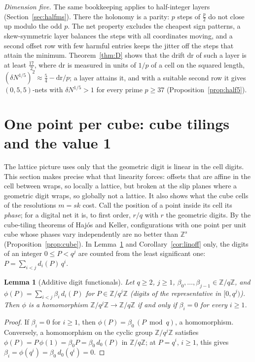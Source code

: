 \documentclass[11pt]{amsart}
\newtheorem{lemma}[theorem]{Lemma}
\theoremstyle{definition}
\theoremstyle{plain}
\newcommand{\Z}{\mathbb{Z}}
\begin{document}
\emph{Dimension five.} The same bookkeeping applies to half-integer layers (Section~\ref{sec:halfms}). There the holonomy is a parity: $p$ steps of $\frac p2$ do not close up modulo the odd $p$. The net property excludes the cheapest sign patterns, a skew-symmetric layer balances the steps with all coordinates moving, and a second offset row with few harmful entries keeps the jitter off the steps that attain the minimum. Theorem~\ref{thm:D} shows that the drift $\mathrm{dr}$ of such a layer is at least $\frac{17}2$, where $\mathrm{dr}$ is measured in units of $1/p$ of a cell on the squared length, $(\delta N^{1/5})^2\approx\frac54-\mathrm{dr}/p$; a layer attains it, and with a suitable second row it gives $(0,5,5)$-nets with $\delta N^{1/5}>1$ for every prime $p\ge37$ (Proposition~\ref{prop:half5}).

\section{One point per cube: cube tilings and the value 1}\label{sec:whylat}
The lattice picture uses only that the geometric digit is linear in the cell digits. This section makes precise what that linearity forces: offsets that are affine in the cell between wraps, so locally a lattice, but broken at the slip planes where a geometric digit wraps, so globally not a lattice. It also shows what the cube cells of the resolutions $m=sk$ cost. Call the position of a point inside its cell its \emph{phase}; for a digital net it is, to first order, $r/q$ with $r$ the geometric digits. By the cube-tiling theorems of Haj\'os and Keller, configurations with one point per unit cube whose phases vary independently are no better than $\Z^s$ (Proposition~\ref{prop:cube}). In Lemma~\ref{lem:hom} and Corollary~\ref{cor:linoff} only, the digits of an integer $0\le P<q^j$ are counted from the least significant one: $P=\sum_{i<j}d_i(P)\,q^i$.

\begin{lemma}[Additive digit functionals]\label{lem:hom}
Let $q\ge2$, $j\ge1$, $\beta_0,\dots,\beta_{j-1}\in\Z/q\Z$, and $\phi(P)=\sum_{i<j}\beta_i\,d_i(P)$ for $P\in\Z/q^j\Z$ (digits of the representative in $[0,q^j)$). Then $\phi$ is a homomorphism $\Z/q^j\Z\to\Z/q\Z$ if and only if $\beta_i=0$ for every $i\ge1$.
\end{lemma}

\begin{proof}
If $\beta_i=0$ for $i\ge1$, then $\phi(P)=\beta_0\,(P\bmod q)$, a homomorphism. Conversely, a homomorphism on the cyclic group $\Z/q^j\Z$ satisfies $\phi(P)=P\,\phi(1)=\beta_0P=\beta_0\,d_0(P)$ in $\Z/q\Z$; at $P=q^i$, $i\ge1$, this gives $\beta_i=\phi(q^i)=\beta_0\,d_0(q^i)=0$.
\end{proof}
\end{document}

